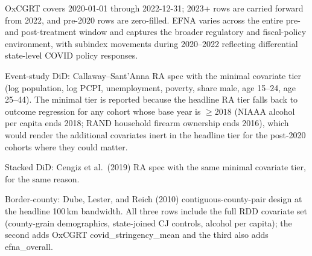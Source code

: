 \begin{threeparttable}
\begin{tablenotes}
\item OxCGRT covers 2020-01-01 through 2022-12-31; 2023+ rows are carried forward from 2022, and pre-2020 rows are zero-filled. EFNA varies across the entire pre- and post-treatment window and captures the broader regulatory and fiscal-policy environment, with subindex movements during 2020--2022 reflecting differential state-level COVID policy responses.
\item Event-study DiD: Callaway--Sant'Anna RA spec with the minimal covariate tier (log population, log PCPI, unemployment, poverty, share male, age 15--24, age 25--44). The minimal tier is reported because the headline RA tier falls back to outcome regression for any cohort whose base year is $\ge 2018$ (NIAAA alcohol per capita ends 2018; RAND household firearm ownership ends 2016), which would render the additional covariates inert in the headline tier for the post-2020 cohorts where they could matter.
\item Stacked DiD: Cengiz et al.\ (2019) RA spec with the same minimal covariate tier, for the same reason.
\item Border-county: Dube, Lester, and Reich (2010) contiguous-county-pair design at the headline 100\,km bandwidth. All three rows include the full RDD covariate set (county-grain demographics, state-joined CJ controls, alcohol per capita); the second adds OxCGRT covid\_stringency\_mean and the third also adds efna\_overall.
\end{tablenotes}
\end{threeparttable}

